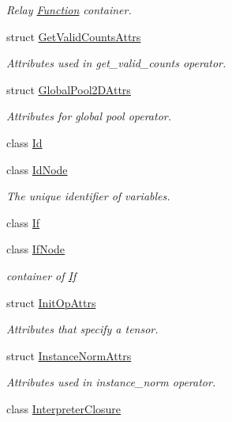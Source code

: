 \begin{DoxyCompactItemize}
\begin{DoxyCompactList}\small\item\em Relay \hyperlink{classtvm_1_1relay_1_1Function}{Function} container. \end{DoxyCompactList}\item 
struct \hyperlink{structtvm_1_1relay_1_1GetValidCountsAttrs}{Get\+Valid\+Counts\+Attrs}
\begin{DoxyCompactList}\small\item\em Attributes used in get\+\_\+valid\+\_\+counts operator. \end{DoxyCompactList}\item 
struct \hyperlink{structtvm_1_1relay_1_1GlobalPool2DAttrs}{Global\+Pool2\+D\+Attrs}
\begin{DoxyCompactList}\small\item\em Attributes for global pool operator. \end{DoxyCompactList}\item 
class \hyperlink{classtvm_1_1relay_1_1Id}{Id}
\item 
class \hyperlink{classtvm_1_1relay_1_1IdNode}{Id\+Node}
\begin{DoxyCompactList}\small\item\em The unique identifier of variables. \end{DoxyCompactList}\item 
class \hyperlink{classtvm_1_1relay_1_1If}{If}
\item 
class \hyperlink{classtvm_1_1relay_1_1IfNode}{If\+Node}
\begin{DoxyCompactList}\small\item\em container of \hyperlink{classtvm_1_1relay_1_1If}{If} \end{DoxyCompactList}\item 
struct \hyperlink{structtvm_1_1relay_1_1InitOpAttrs}{Init\+Op\+Attrs}
\begin{DoxyCompactList}\small\item\em Attributes that specify a tensor. \end{DoxyCompactList}\item 
struct \hyperlink{structtvm_1_1relay_1_1InstanceNormAttrs}{Instance\+Norm\+Attrs}
\begin{DoxyCompactList}\small\item\em Attributes used in instance\+\_\+norm operator. \end{DoxyCompactList}\item 
class \hyperlink{classtvm_1_1relay_1_1InterpreterClosure}{Interpreter\+Closure}

\end{DoxyCompactItemize}
